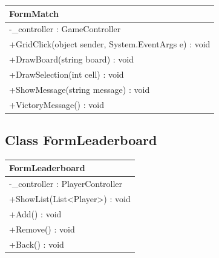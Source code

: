 \documentclass[12pt]{article}
\begin{document}
\begin{table}[H]
    \begin{tabular}{|l|}
    \hline
    \rowcolor[HTML]{C0C0C0} 
    \textbf{FormMatch}                                   \\ \hline
    \rowcolor[HTML]{EFEFEF} 
    -\_controller : GameController                       \\ \hline
    \rowcolor[HTML]{FFFFFF} 
    +GridClick(object sender, System.EventArgs e) : void \\ \hline
    +DrawBoard(string board) : void                      \\ \hline
    +DrawSelection(int cell) : void                      \\ \hline
    +ShowMessage(string message) : void                  \\ \hline
    +VictoryMessage() : void                             \\ \hline
    \end{tabular}
\end{table}

\newpage


\subsection{Class FormLeaderboard}

\begin{table}[H]
    \begin{tabular}{|l|}
    \hline
    \rowcolor[HTML]{C0C0C0} 
    \textbf{FormLeaderboard}                                    \\ \hline
    \rowcolor[HTML]{EFEFEF} 
    -\_controller : PlayerController                      \\ \hline
    \rowcolor[HTML]{FFFFFF} 
    +ShowList(List\textless{}Player\textgreater{}) : void \\ \hline
    +Add() : void                                         \\ \hline
    +Remove() : void                                      \\ \hline
    +Back() : void                                        \\ \hline
    \end{tabular}
\end{table}

\newpage
\end{document}
